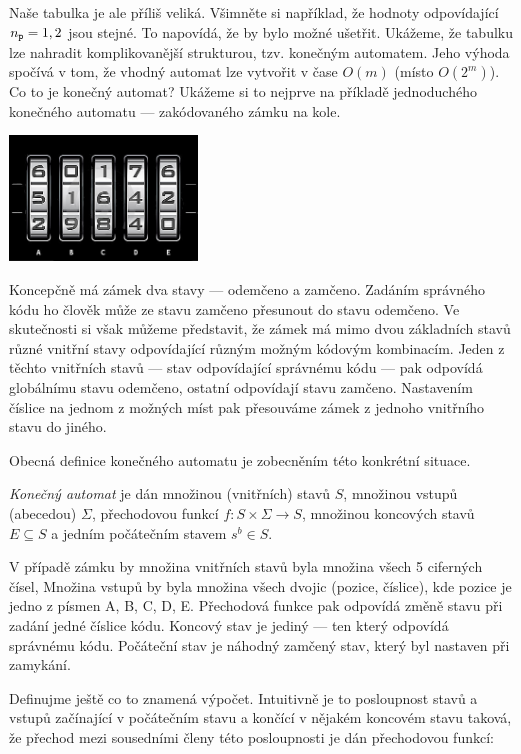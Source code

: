 Naše tabulka je ale příliš veliká. Všimněte si například, že hodnoty odpovídající
\(n_{\tt p} = 1,2\) jsou stejné.  To napovídá, že by bylo možné ušetřit. Ukážeme, 
že tabulku lze nahradit komplikovanější strukturou, tzv. konečným automatem. 
Jeho výhoda spočívá v tom, že vhodný automat  lze vytvořit v čase \(O(m)\) 
(místo \(O(2^{m})\)). Co to je konečný automat?  Ukážeme si to nejprve na příkladě
jednoduchého konečného automatu --- zakódovaného zámku na kole. 

\begin{center}
 \includegraphics[width=5cm]{combination-lock}
\end{center}

Koncepčně má zámek dva stavy --- odemčeno a zamčeno.  Zadáním správného kódu 
ho člověk může ze stavu zamčeno přesunout
do stavu odemčeno.  Ve skutečnosti si však můžeme představit, že zámek má mimo
dvou základních stavů různé vnitřní stavy odpovídající různým možným kódovým
kombinacím. Jeden z těchto vnitřních stavů --- stav odpovídající správnému kódu ---
pak odpovídá globálnímu stavu odemčeno, ostatní odpovídají stavu zamčeno. 
Nastavením číslice na jednom z možných míst pak přesouváme zámek z jednoho
vnitřního stavu do jiného.

Obecná definice konečného automatu je zobecněním této konkrétní situace.

\begin{definition} \emph{Konečný automat} je dán množinou (vnitřních) stavů \(S\),
množinou vstupů (abecedou) \(\Sigma\), přechodovou funkcí \(f:S\times\Sigma\to S\),
množinou koncových stavů \(E\subseteq S\) a jedním počátečním stavem \(s^b\in S\).
\end{definition}

V případě zámku by množina vnitřních stavů byla množina všech 5 ciferných čísel,
Množina vstupů by byla množina všech dvojic (pozice, číslice), kde pozice je jedno z 
písmen A, B, C, D, E. Přechodová funkce pak odpovídá změně stavu při zadání jedné
číslice kódu. Koncový stav je jediný --- ten který odpovídá správnému kódu. 
Počáteční stav je náhodný zamčený stav, který byl nastaven při zamykání. 

Definujme ještě co to znamená výpočet. Intuitivně je to posloupnost stavů a vstupů
začínající v počátečním stavu a končící v nějakém koncovém stavu taková, že přechod 
mezi sousedními členy této posloupnosti je dán přechodovou funkcí:

